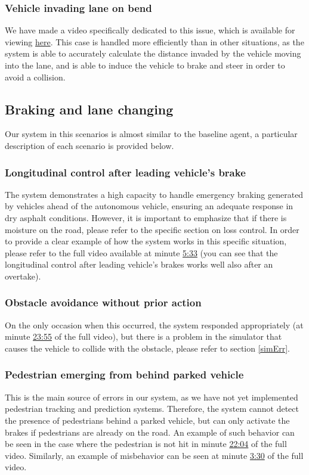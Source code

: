 \documentclass{article}
\begin{document}
\subsubsection{Vehicle invading lane on bend}
We have made a video specifically dedicated to this issue, which is available for viewing \href{https://youtu.be/KME91FAB5ko}{here}. This case is handled more efficiently than in other situations, 
as the system is able to accurately calculate the distance invaded by the vehicle moving into the lane, and is able to induce the vehicle to brake and steer in 
order to avoid a collision.

\subsection{Braking and lane changing}
Our system in this scenarios is almost similar to the baseline agent, a particular description of each scenario is provided below.
\subsubsection{Longitudinal control after leading vehicle’s brake}
The system demonstrates a high capacity to handle emergency braking generated by vehicles ahead of the autonomous vehicle, ensuring an adequate response in 
dry asphalt conditions. However, it is important to emphasize that if there is moisture on the road, please refer to the specific section on loss control. 
In order to provide a clear example of how the system works in this specific situation, please refer to the full video available at minute \href{https://youtu.be/RBGWd_so80U?t=333}{5:33} (you can see that the longitudinal control after leading vehicle's brakes works well also after an overtake).
\subsubsection{Obstacle avoidance without prior action}
On the only occasion when this occurred, the system responded appropriately (at minute \href{https://youtu.be/RBGWd_so80U?t=1435}{23:55} of the full video), 
but there is a problem in the simulator that causes the vehicle to collide with the obstacle, please refer to section \ref{simErr}.
\subsubsection{Pedestrian emerging from behind parked vehicle}
This is the main source of errors in our system, as we have not yet implemented pedestrian tracking and prediction systems. Therefore, the system cannot detect 
the presence of pedestrians behind a parked vehicle, but can only activate the brakes if pedestrians are already on the road. An example of such behavior can 
be seen in the case where the pedestrian is not hit in minute \href{https://youtu.be/RBGWd_so80U?t=1324}{22:04} of the full video. Similarly, an example of misbehavior can be seen at 
minute \href{https://youtu.be/RBGWd_so80U?t=210}{3:30} of the full video.
\end{document}
